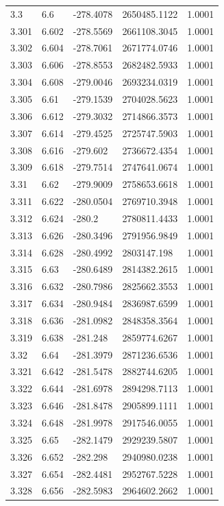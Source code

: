 \begin{tabular}{lllll}
3.3 & 6.6 & -278.4078 & 2650485.1122 & 1.0001 \\
3.301 & 6.602 & -278.5569 & 2661108.3045 & 1.0001 \\
3.302 & 6.604 & -278.7061 & 2671774.0746 & 1.0001 \\
3.303 & 6.606 & -278.8553 & 2682482.5933 & 1.0001 \\
3.304 & 6.608 & -279.0046 & 2693234.0319 & 1.0001 \\
3.305 & 6.61 & -279.1539 & 2704028.5623 & 1.0001 \\
3.306 & 6.612 & -279.3032 & 2714866.3573 & 1.0001 \\
3.307 & 6.614 & -279.4525 & 2725747.5903 & 1.0001 \\
3.308 & 6.616 & -279.602 & 2736672.4354 & 1.0001 \\
3.309 & 6.618 & -279.7514 & 2747641.0674 & 1.0001 \\
3.31 & 6.62 & -279.9009 & 2758653.6618 & 1.0001 \\
3.311 & 6.622 & -280.0504 & 2769710.3948 & 1.0001 \\
3.312 & 6.624 & -280.2 & 2780811.4433 & 1.0001 \\
3.313 & 6.626 & -280.3496 & 2791956.9849 & 1.0001 \\
3.314 & 6.628 & -280.4992 & 2803147.198 & 1.0001 \\
3.315 & 6.63 & -280.6489 & 2814382.2615 & 1.0001 \\
3.316 & 6.632 & -280.7986 & 2825662.3553 & 1.0001 \\
3.317 & 6.634 & -280.9484 & 2836987.6599 & 1.0001 \\
3.318 & 6.636 & -281.0982 & 2848358.3564 & 1.0001 \\
3.319 & 6.638 & -281.248 & 2859774.6267 & 1.0001 \\
3.32 & 6.64 & -281.3979 & 2871236.6536 & 1.0001 \\
3.321 & 6.642 & -281.5478 & 2882744.6205 & 1.0001 \\
3.322 & 6.644 & -281.6978 & 2894298.7113 & 1.0001 \\
3.323 & 6.646 & -281.8478 & 2905899.1111 & 1.0001 \\
3.324 & 6.648 & -281.9978 & 2917546.0055 & 1.0001 \\
3.325 & 6.65 & -282.1479 & 2929239.5807 & 1.0001 \\
3.326 & 6.652 & -282.298 & 2940980.0238 & 1.0001 \\
3.327 & 6.654 & -282.4481 & 2952767.5228 & 1.0001 \\
3.328 & 6.656 & -282.5983 & 2964602.2662 & 1.0001 \\

\end{tabular}

